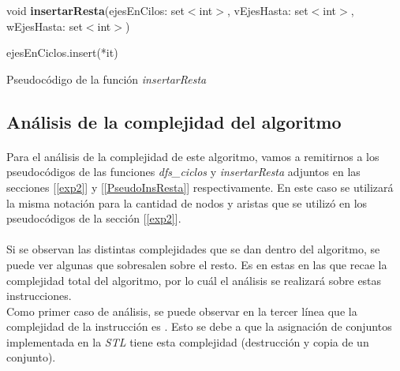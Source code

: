 \vspace{11pt}

\incmargin{1em}
\linesnumbered
{}

void \textbf{insertarResta}(ejesEnCilos: set$<$int$>$, vEjesHasta: set$<$int$>$, wEjesHasta: set$<$int$>$) \\
\begin{algorithm}[H]
	\BlankLine
	 {
		 {ejesEnCiclos.insert(*it)}
	}
	
	\caption{Pseudocódigo de la función \textit{insertarResta}}
\end{algorithm}


\subsection{Análisis de la complejidad del algoritmo}
\label{complejidad2}

\paragraph{}
Para el análisis de la complejidad de este algoritmo, vamos a remitirnos a los pseudocódigos de las funciones \textit{dfs\_ciclos} y \textit{insertarResta} adjuntos en las secciones [\ref{exp2}] y [\ref{PseudoInsResta}] respectivamente. En este caso se utilizará la misma notación para la cantidad de nodos y aristas que se utilizó en los pseudocódigos de la sección [\ref{exp2}].

\paragraph{}
Si se observan las distintas complejidades que se dan dentro del algoritmo, se puede ver algunas que sobresalen sobre el resto. Es en estas en las que recae la complejidad total del algoritmo, por lo cuál el análisis se realizará sobre estas instrucciones.\\
Como primer caso de análisis, se puede observar en la tercer línea que la complejidad de la instrucción es . Esto se debe a que la asignación de conjuntos implementada en la \textit{STL} tiene esta complejidad (destrucción y copia de un conjunto).

